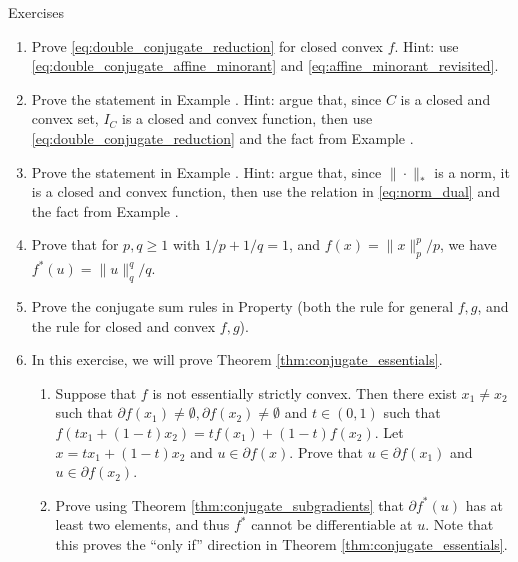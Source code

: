 \begin{xcb}{Exercises}
\begin{enumerate}[label=\thechapter.\arabic*]
\item \label{ex:double_conjugate_reduction} 
  Prove \eqref{eq:double_conjugate_reduction} for closed convex $f$. Hint: use
  \eqref{eq:double_conjugate_affine_minorant} and
  \eqref{eq:affine_minorant_revisited}.  

\item \label{ex:support_function_conjugate}
  Prove the statement in Example . Hint:
  argue that, since $C$ is a closed and convex set, $I_C$ is a closed and convex
  function, then use \eqref{eq:double_conjugate_reduction} and the fact from 
  Example . 

\item \label{ex:norm_conjugate}
  Prove the statement in Example . Hint: argue that,
  since $\|\cdot\|_*$ is a norm, it is a closed and convex function, then use
  the relation in \eqref{eq:norm_dual} and the fact from Example 
  .  
 
\item Prove that for $p,q \geq 1$ with $1/p + 1/q = 1$, and $f(x) =
  \|x\|_p^p/p$, we have $f^*(u) = \|u\|_q^q/q$.  

\item Prove the conjugate sum rules in Property
   (both the rule for general $f,g$, and the
  rule for closed and convex $f,g$).  

\item \label{ex:conjugate_essentials} 
  In this exercise, we will prove Theorem \ref{thm:conjugate_essentials}.

\begin{enumerate}[label=\alph*.]
\item Suppose that $f$ is not essentially strictly convex. Then there exist
  $x_1 \not= x_2$ such that $\partial f(x_1) \not= \emptyset, \partial f(x_2)
  \not= \emptyset$ and $t \in (0,1)$ such that $f(tx_1 + (1-t)x_2) = tf(x_1) +
  (1-t)f(x_2)$. Let $x = tx_1 + (1-t)x_2$ and $u \in \partial f(x)$. Prove that
  $u \in \partial f(x_1)$ and $u \in \partial f(x_2)$.  

\item Prove using Theorem \ref{thm:conjugate_subgradients} that $\partial
  f^*(u)$ has at least two elements, and thus $f^*$ cannot be differentiable at
  $u$. Note that this proves the ``only if'' direction in Theorem
  \ref{thm:conjugate_essentials}.  


\end{enumerate}
\end{enumerate}
\end{xcb}
